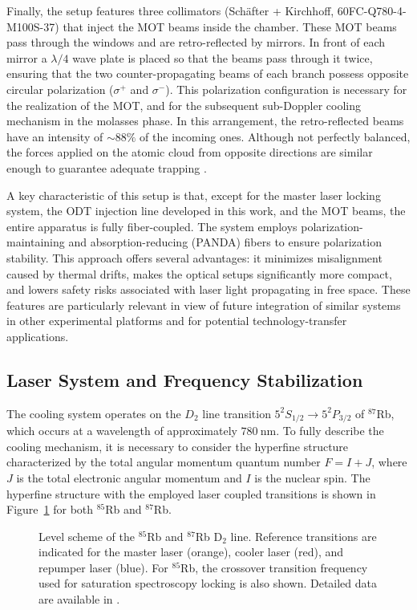 Finally, the setup features three collimators (Schäfter + Kirchhoff, 60FC-Q780-4-M100S-37) that inject the MOT beams inside the chamber. These MOT beams pass through the windows and are retro-reflected by mirrors. In front of each mirror a $\lambda/4$ wave plate is placed so that the beams pass through it twice, ensuring that the two counter-propagating beams of each branch possess opposite circular polarization ($\sigma^{+}$ and $\sigma^{-}$). This polarization configuration is necessary for the realization of the MOT, and for the subsequent sub-Doppler cooling mechanism in the molasses phase. In this arrangement, the retro-reflected beams have an intensity of $\sim 88\%$ of the incoming ones. Although not perfectly balanced, the forces applied on the atomic cloud from opposite directions are similar enough to guarantee adequate trapping \cite{marchesini2025PHD}.

A key characteristic of this setup is that, except for the master laser locking system, the ODT injection line developed in this work, and the MOT beams, the entire apparatus is fully fiber-coupled. The system employs polarization-maintaining and absorption-reducing (PANDA) fibers \cite{Sasaki:82-PANDA} to ensure polarization stability. This approach offers several advantages: it minimizes misalignment caused by thermal drifts, makes the optical setups significantly more compact, and lowers safety risks associated with laser light propagating in free space. These features are particularly relevant in view of future integration of similar systems in other experimental platforms and for potential technology-transfer applications.

\subsection{Laser System and Frequency Stabilization}
The cooling system operates on the $D_2$ line transition $5^{2}S_{1/2} \rightarrow 5^{2}P_{3/2}$ of $^{87}$Rb, which occurs at a wavelength of approximately $780~\text{nm}$. To fully describe the cooling mechanism, it is necessary to consider the hyperfine structure characterized by the total angular momentum quantum number $F=I+J$, where $J$ is the total electronic angular momentum and $I$ is the nuclear spin. The hyperfine structure with the employed laser coupled transitions is shown in Figure~\ref{fig:laser_configuration} for both $^{85}$Rb and $^{87}$Rb. 
\begin{figure}[t]
    \centering
    
    \caption{Level scheme of the $^{85}$Rb and $^{87}$Rb D$_2$ line. Reference transitions are indicated for the master laser (orange), cooler laser (red), and repumper laser (blue). For $^{85}$Rb, the crossover transition frequency used for saturation spectroscopy locking is also shown. Detailed data are available in \cite{steck-rb85, steck-rb87}.}
    \label{fig:laser_configuration}
\end{figure}

